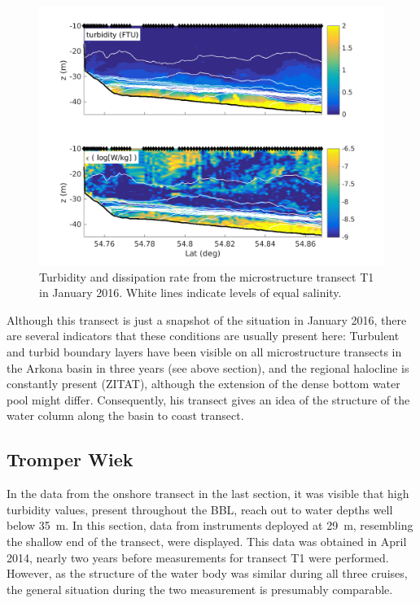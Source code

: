 \begin{figure}[ht]
\includegraphics[width=40pc]{bilder/abtrans.png}
 \caption{Turbidity and dissipation rate from the microstructure transect T1 
in January 2016. White lines indicate levels of equal salinity.}
 \label{transect}
 \end{figure}
 
 Although this transect is just a snapshot of the situation in January 
2016, there are several indicators that these conditions are usually present 
here: Turbulent and turbid boundary layers have been visible on all 
microstructure transects in the Arkona basin in three years (see above section), 
and the regional halocline is constantly present (ZITAT), although the extension 
of the dense bottom water pool might differ. Consequently, his transect gives 
an idea of the structure of the water column along the basin to coast transect.
  
\FloatBarrier
\subsection{Tromper Wiek}

In the data from the onshore transect in the last section, it was visible that 
high turbidity values, present throughout the BBL, reach out to water depths 
well below 35~m. In this section, data from instruments deployed at 29~m, 
resembling the shallow end of the transect, were displayed. This data was 
obtained in April 2014, nearly two years before measurements for transect T1 
were performed. However, as the structure of the water body was similar during 
all three cruises, the general situation during the two measurement is 
presumably comparable.

